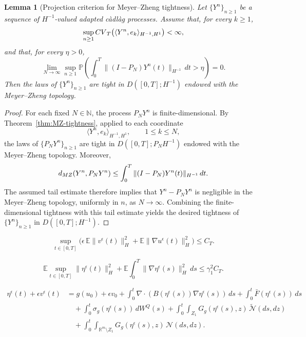 \documentclass[10pt,a4paper]{amsart}
\theoremstyle{plain}
\newtheorem{lemma}[theorem]{Lemma}
\numberwithin{equation}{section}
\begin{document}
\begin{lemma}[Projection criterion for Meyer--Zheng tightness]
\label{lem:MZ-projection-tightness}
Let \(\{Y^n\}_{n\ge1}\) be a sequence of \(H^{-1}\)-valued adapted c\`adl\`ag processes. Assume that, for every \(k\ge1\),
\[
\sup_{n\ge1}{\rm CV}_T\bigl(\langle Y^n,e_k\rangle_{H^{-1},H^1}\bigr)<\infty,
\]
and that, for every \(\eta>0\),
\[
\lim_{N\to\infty}\sup_{n\ge1}\mathbb P\left(\int_0^T\|(I-P_N)Y^n(t)\|_{H^{-1}}\,dt>\eta\right)=0.
\]
Then the laws of \(\{Y^n\}_{n\ge1}\) are tight in \(D([0,T];H^{-1})\) endowed with the Meyer--Zheng topology.
\end{lemma}

\begin{proof}
For each fixed \(N\in\mathbb N\), the process \(P_NY^n\) is
finite-dimensional. By Theorem~\ref{thm:MZ-tightness}, applied to each
coordinate
\[
\langle Y^n,e_k\rangle_{H^{-1},H^1},\qquad 1\le k\le N,
\]
the laws of \(\{P_NY^n\}_{n\ge1}\) are tight in \(D([0,T];P_NH^{-1})\) endowed with the Meyer--Zheng topology.
Moreover,
\[
d_{\rm MZ}(Y^n,P_NY^n)\le\int_0^T\|(I-P_N)Y^n(t)\|_{H^{-1}}\,dt .
\]
The assumed tail estimate therefore implies that \(Y^n-P_NY^n\) is negligible in the Meyer--Zheng topology, uniformly in \(n\), as
\(N\to\infty\). Combining the finite-dimensional tightness with this tail estimate yields the desired tightness of \(\{Y^n\}_{n\ge1}\) in
\(D([0,T];H^{-1})\).
\end{proof}

\begin{equation}\label{a-priori-v}
\sup_{t\in[0,T]}
\Big(
\epsilon\,\mathbb E\|v^{\epsilon}(t)\|_H^2
+ \mathbb E\|\nabla u^{\epsilon}(t)\|_H^2
\Big)
\le C_T .
\end{equation}

\begin{equation}\label{lemma-g-2}
\mathbb{E}\sup_{t\in [0,T]}\|\eta^\epsilon(t)\|_H^2  +\mathbb{E}\int_0^T \|\nabla \eta^{\epsilon}(s)\|_{H}^2\,ds
\leq \gamma_1^2 C_T.
\end{equation}

\begin{align}\label{lemma-g-3}
\eta^\epsilon(t) + \epsilon   v^\epsilon(t) 
&= g(u_0) + \epsilon v_0 
+ \int_0^t \nabla \cdot \left( B(\eta^\epsilon(s)) \nabla \eta^\epsilon(s) \right)\,ds 
+ \int_0^t \bar{F}(\eta^\epsilon(s))\,ds \nonumber \\
&\quad + \int_0^t \sigma_g(\eta^\epsilon(s))\,dW^Q(s)
+ \int_0^t \int_{Z_1} G_g(\eta^\epsilon(s),z)\,\tilde{{\mathcal N}}(ds,dz) \nonumber \\
&\quad + \int_0^t \int_{\mathbb{R}^m \setminus Z_1} G_g(\eta^\epsilon(s),z)\,{\mathcal N}(ds,dz).
\end{align}
\end{document}
